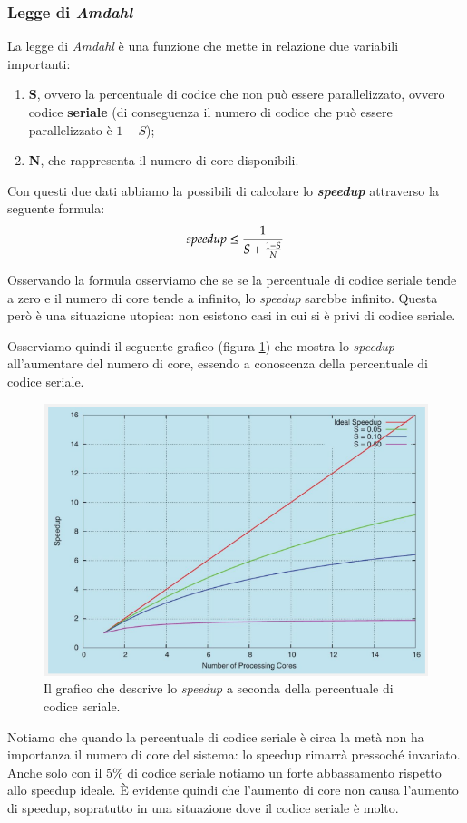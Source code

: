 \subsubsection{Legge di \textit{Amdahl}}
La legge di \textit{Amdahl} è una funzione che mette in relazione due variabili importanti:
\vspace{-5px}
\begin{enumerate}
\setlength{\itemsep}{-.15 em}
    \item \textbf{S}, ovvero la percentuale di codice che non può essere parallelizzato, ovvero codice \textbf{seriale} (di conseguenza il numero di codice che può essere parallelizzato è $1 - S$);
    \item \textbf{N}, che rappresenta il numero di core disponibili. 
\end{enumerate}

\noindent Con questi due dati abbiamo la possibili di calcolare lo \textit{\textbf{speedup}} attraverso la seguente formula:
\begin{equation*}
    \text{\textit{speedup}} \leq \frac{1}{S + \frac{1 - S}{N}}
\end{equation*}

\noindent Osservando la formula osserviamo che se se la percentuale di codice seriale tende a zero e il numero di core tende a infinito, lo \textit{speedup} sarebbe infinito. Questa però è una situazione utopica: non esistono casi in cui si è privi di codice seriale.

Osserviamo quindi il seguente grafico (figura \ref{fig:speedup}) che mostra lo \textit{speedup} all'aumentare del numero di core, essendo a conoscenza della percentuale di codice seriale.
\begin{figure}[!h]
    \centering
    \includegraphics[width=.6\textwidth]{../res/imgs/threads/speedup.png}
    \caption{Il grafico che descrive lo \textit{speedup} a seconda della percentuale di codice seriale.}
    \label{fig:speedup}
\end{figure}
Notiamo che quando la percentuale di codice seriale è circa la metà non ha importanza il numero di core del sistema: lo speedup rimarrà pressoché invariato. Anche solo con il 5\% di codice seriale notiamo un forte abbassamento rispetto allo speedup ideale. È evidente quindi che l'aumento di core non causa l'aumento di speedup, sopratutto in una situazione dove il codice seriale è molto. 
% 
